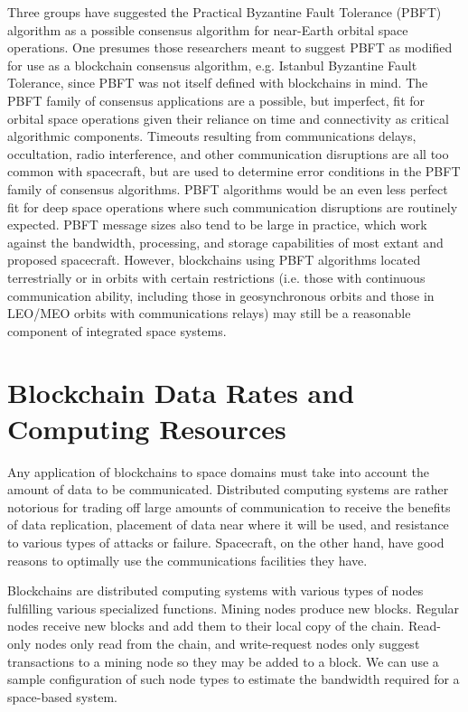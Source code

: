 \documentclass[journal ]{new-aiaa}
\begin{document}
Three groups have suggested the Practical Byzantine Fault Tolerance (PBFT) algorithm\cite{castro_practical_1999} as a possible consensus algorithm for near-Earth orbital space operations\cite{yu_blockchain_2019,molesky_blockchain_2018,mital_blockchain_2019}. One presumes those researchers meant to suggest PBFT as modified for use as a blockchain consensus algorithm, e.g. Istanbul Byzantine Fault Tolerance\cite{lin_istanbul_2017}, since PBFT was not itself defined with blockchains in mind. The PBFT family of consensus applications are a 
possible, but imperfect, fit for orbital space operations given their reliance on time and connectivity as critical algorithmic components. Timeouts resulting from communications delays, occultation, radio interference, and other communication disruptions are all too common with spacecraft, but are used to determine error conditions in the PBFT family of consensus algorithms. PBFT algorithms would be an even less perfect fit for deep space operations where such communication disruptions are routinely expected. PBFT message sizes also tend to be large in practice, which work against the bandwidth, processing, and storage capabilities of most extant and proposed spacecraft. However, blockchains using PBFT algorithms located terrestrially or in orbits with certain restrictions (i.e. those with continuous communication ability, including those in geosynchronous orbits and those in LEO/MEO orbits with communications relays) may still be a reasonable component of integrated space systems.

\section{Blockchain Data Rates and Computing Resources}\label{sec:datarates}

Any application of blockchains to space domains must take into account the amount of data to be communicated. Distributed computing systems are rather notorious for trading off large amounts of communication to receive the benefits of data replication, placement of data near where it will be used, and resistance to various types of attacks or failure. Spacecraft, on the other hand, have good reasons to optimally use the communications facilities they have.

Blockchains are distributed computing systems with various types of nodes fulfilling various specialized functions. Mining nodes produce new blocks. Regular nodes receive new blocks and add them to their local copy of the chain. Read-only nodes only read from the chain, and write-request nodes only suggest transactions to a mining node so they may be added to a block. We can use a sample configuration of such node types to estimate the bandwidth required for a space-based system.
\end{document}
